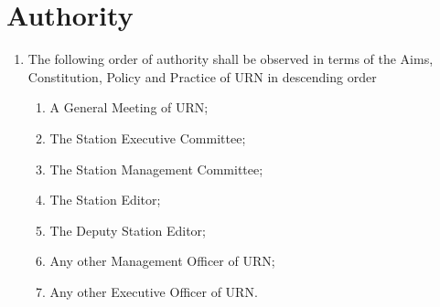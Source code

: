 \section{Authority}

\begin{enumerate}[label*=\thesection.\arabic*.]
    \item The following order of authority shall be observed in terms of the Aims, Constitution, Policy and Practice of URN in descending order
          \begin{enumerate}[label*=\arabic*.]
              \item A General Meeting of URN;
              \item The Station Executive Committee;
              \item The Station Management Committee;
              \item The Station Editor;
              \item The Deputy Station Editor;
              \item Any other Management Officer of URN;
              \item Any other Executive Officer of URN.
          \end{enumerate}
\end{enumerate}
